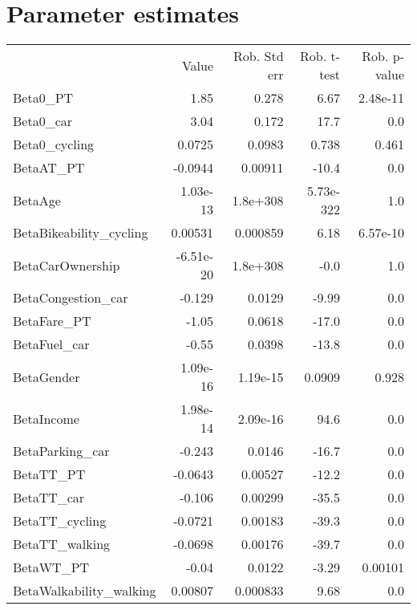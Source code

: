 \section{Parameter estimates}
\begin{tabular}{lrrrr}
 & Value & Rob. Std err & Rob. t-test & Rob. p-value \\
Beta0_PT & 1.85 & 0.278 & 6.67 & 2.48e-11 \\
Beta0_car & 3.04 & 0.172 & 17.7 & 0.0 \\
Beta0_cycling & 0.0725 & 0.0983 & 0.738 & 0.461 \\
BetaAT_PT & -0.0944 & 0.00911 & -10.4 & 0.0 \\
BetaAge & 1.03e-13 & 1.8e+308 & 5.73e-322 & 1.0 \\
BetaBikeability_cycling & 0.00531 & 0.000859 & 6.18 & 6.57e-10 \\
BetaCarOwnership & -6.51e-20 & 1.8e+308 & -0.0 & 1.0 \\
BetaCongestion_car & -0.129 & 0.0129 & -9.99 & 0.0 \\
BetaFare_PT & -1.05 & 0.0618 & -17.0 & 0.0 \\
BetaFuel_car & -0.55 & 0.0398 & -13.8 & 0.0 \\
BetaGender & 1.09e-16 & 1.19e-15 & 0.0909 & 0.928 \\
BetaIncome & 1.98e-14 & 2.09e-16 & 94.6 & 0.0 \\
BetaParking_car & -0.243 & 0.0146 & -16.7 & 0.0 \\
BetaTT_PT & -0.0643 & 0.00527 & -12.2 & 0.0 \\
BetaTT_car & -0.106 & 0.00299 & -35.5 & 0.0 \\
BetaTT_cycling & -0.0721 & 0.00183 & -39.3 & 0.0 \\
BetaTT_walking & -0.0698 & 0.00176 & -39.7 & 0.0 \\
BetaWT_PT & -0.04 & 0.0122 & -3.29 & 0.00101 \\
BetaWalkability_walking & 0.00807 & 0.000833 & 9.68 & 0.0 \\
\end{tabular}

